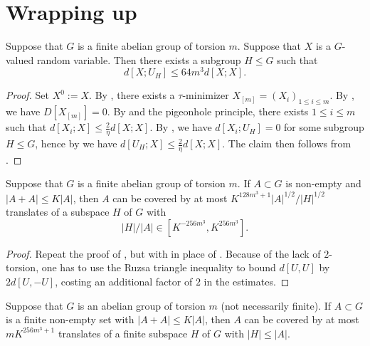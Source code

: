 \section{Wrapping up}

\begin{theorem}\label{main-entropy}\leanok Suppose that $G$ is a finite abelian group of torsion $m$.  Suppose that $X$ is a $G$-valued random variable. Then there exists a subgroup $H \leq G$ such that \[ d[X;U_H] \leq 64 m^3 d[X;X].\]
\end{theorem}

\begin{proof}\leanok  Set $X^0 := X$. By , there exists a $\tau$-minimizer $X_{[m]} = (X_i)_{1 \leq i \leq m}$.  By , we have $D[X_{[m]}]=0$. By  and the pigeonhole principle, there exists $1 \leq i \leq m$ such that $d[X_i; X] \leq \frac{2}{\eta} d[X;X]$.  By , we have $d[X_i;U_H]=0$ for some subgroup $H \leq G$, hence by  we have $d[U_H; X] \leq \frac{2}{\eta} d[X;X]$. The claim then follows from .
\end{proof}

\begin{lemma}\label{pfr_aux_torsion}\leanok  Suppose that $G$ is a finite abelian group of torsion $m$.  If $A \subset G$ is non-empty and
  $|A+A| \leq K|A|$, then $A$ can be covered by at most $K ^
  {128m^3+1}|A|^{1/2}/|H|^{1/2}$ translates of a subspace $H$ of $G$ with
  \begin{equation}
    \label{ah2}
    |H|/|A| \in [K^{-256m^3}, K^{256m^3}].
  \end{equation}
  \end{lemma}

\begin{proof}\leanok  Repeat the proof of , but with  in place of .  Because of the lack of $2$-torsion, one has to use the Ruzsa triangle inequality to bound $d[U,U]$ by $2d[U,-U]$, costing an additional factor of $2$ in the estimates.
\end{proof}

\begin{theorem}[PFR]\label{pfr-torsion}\leanok  Suppose that $G$ is an abelian group of torsion $m$ (not necessarily finite).
  If $A \subset G$ is a finite non-empty set with $|A+A| \leq K|A|$, then $A$ can be covered by at most $mK^{256m^3+1}$ translates of a finite subspace $H$ of $G$ with $|H| \leq |A|$.
  \end{theorem}

